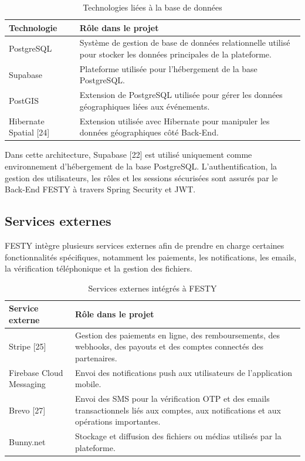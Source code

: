 \begin{table}[H]
\centering
\caption{Technologies liées à la base de données}
\label{tableau:2-12}
\renewcommand{\arraystretch}{1.2}
\begin{tabularx}{\textwidth}{|>{\raggedright\arraybackslash}X|>{\raggedright\arraybackslash}X|}
\hline
\rowcolor[HTML]{ECF4FF}
\textbf{Technologie} & \textbf{Rôle dans le projet} \\
\hline
PostgreSQL & Système de gestion de base de données relationnelle utilisé pour stocker les données principales de la plateforme. \\
\hline
Supabase & Plateforme utilisée pour l’hébergement de la base PostgreSQL. \\
\hline
PostGIS & Extension de PostgreSQL utilisée pour gérer les données géographiques liées aux événements. \\
\hline
Hibernate Spatial [24] & Extension utilisée avec Hibernate pour manipuler les données géographiques côté Back-End. \\
\hline
\end{tabularx}
\end{table}


Dans cette architecture, Supabase [22] est utilisé uniquement comme environnement d’hébergement de la base PostgreSQL. L’authentification, la gestion des utilisateurs, les rôles et les sessions sécurisées sont assurés par le Back-End FESTY à travers Spring Security et JWT.


\subsection{Services externes}


FESTY intègre plusieurs services externes afin de prendre en charge certaines fonctionnalités spécifiques, notamment les paiements, les notifications, les emails, la vérification téléphonique et la gestion des fichiers.


\begin{table}[H]
\centering
\caption{Services externes intégrés à FESTY}
\label{tableau:2-13}
\renewcommand{\arraystretch}{1.2}
\begin{tabularx}{\textwidth}{|>{\raggedright\arraybackslash}X|>{\raggedright\arraybackslash}X|}
\hline
\rowcolor[HTML]{ECF4FF}
\textbf{Service externe} & \textbf{Rôle dans le projet} \\
\hline
Stripe [25] & Gestion des paiements en ligne, des remboursements, des webhooks, des payouts et des comptes connectés des partenaires. \\
\hline
Firebase Cloud Messaging & Envoi des notifications push aux utilisateurs de l’application mobile. \\
\hline
Brevo [27] & Envoi des SMS pour la vérification OTP et des emails transactionnels liés aux comptes, aux notifications et aux opérations importantes. \\
\hline
Bunny.net & Stockage et diffusion des fichiers ou médias utilisés par la plateforme. \\
\hline
\end{tabularx}
\end{table}



